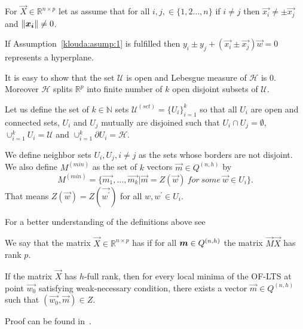 \begin{assumption} \label{klouda:asump:1}
    For $\vec{X} \in \mathbb{R}^{n \times p}$ let as assume that for all $i,j, \in \{{1,2 \ldots, n \}}$  if $ i \neq j$ then $\vec{x_i} \neq \pm \vec{x_j}$ and $\left\lVert\boldsymbol{x_i}\right\rVert \neq 0$.
\end{assumption}

If Assumption~\ref{klouda:asump:1} is fulfilled then $ y_i \pm y_j + (\vec{x_i} \pm \vec{x_j})  \vec{w} = 0$ represents a hyperplane. 

It is easy to show that the set $\mathcal{U}$ is open and Lebesgue measure of $\mathcal{H}$  is $0$. Moreover $\mathcal{H}$ splits $\mathbb{R}^{p}$ into finite number of $k$ open disjoint subsets of $\mathcal{U}$. 

\begin{definition}
    Let us define the set of $k \in \mathbb{N}$ sets $\mathcal{U}^{(set)} = \{{ U_i\}}_{i=1}^{k}$ so that
    all $U_i$ are open and connected sets, $U_i$ and $U_j$ mutually are disjoined such that $U_i \cap  U_j = \emptyset$, $\cup_{i=1}^{k}    U_i = \mathcal{U}$ and $\cup_{i=1}^{k}    \partial U_i =  \mathcal{H}$.

    We define neighbor sets $U_i, U_j, i \neq j$ as the sets whose borders are not disjoint. 
    We also define $M^{(min)}$ as the set of $k$ vectors $\vec{m} \in Q^{(n,h)}$ by 
    \begin{equation*}
        M^{(min)} = \{{ \vec{m_1}, \ldots, \vec{m_k} | \vec{m} = Z(\vec{w})~for~some~\vec{w} \in U_i  \}}.
    \end{equation*}
    That means $Z(\vec{w}) = Z(\vec{w^{\prime}})$ for all $w, w^{\prime} \in U_i$.
\end{definition}

For a better understanding of the definitions above see 

We say that the matrix $\vec{X} \in \mathbb{R}^{n \times p}$ has  if for all $\boldsymbol{m} \in Q^{(n,h)}$ the matrix $\vec{M}\vec{X}$ has rank $p$.

\begin{theorem} \label{minimas:in:relation}
    If the matrix $\vec{X}$ has $h$-full rank, then for every local minima of the OF-LTS at point $\vec{w_{0}}$ satisfying weak-necessary condition, there exists a vector $\vec{m} \in Q^{(n,h)}$ such that $(\vec{w_{0}}, \vec{m}) \in Z$.
\end{theorem}
Proof can be found in~\cite[Theorem~7]{klouda2015exact}. 

